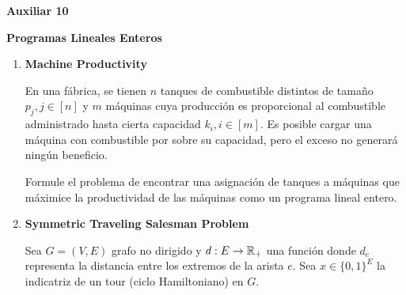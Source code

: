 

\header
\begin{center}
	\LARGE \bf{Auxiliar 10}
\end{center}

\begin{center}
	\bf{Programas Lineales Enteros}\\
\end{center}

\begin{enumerate}[label ={\bf P\arabic*}]
	\item \textbf{Machine Productivity}

	En una fábrica, se tienen $n$ tanques de combustible distintos de tamaño $p_j, j\in[n]$ y $m$ máquinas cuya producción es proporcional al combustible administrado hasta cierta capacidad $k_i, i\in [m]$. Es posible cargar una máquina con combustible por sobre su capacidad, pero el exceso no generará ningún beneficio.
	
	Formule el problema de encontrar una asignación de tanques a máquinas que máximice la productividad de las máquinas como un programa lineal entero.
	
	\item \textbf{Symmetric Traveling Salesman Problem}
	
	Sea $G=(V, E)$ grafo no dirigido y $d: E \rightarrow \mathbb{R}_+$ una función donde $d_e$ representa la distancia entre los extremos de la arista $e$.
	Sea $x \in \{0,1\}^{E}$ la indicatriz de un tour (ciclo Hamiltoniano) en $G$.
	




\end{enumerate}
